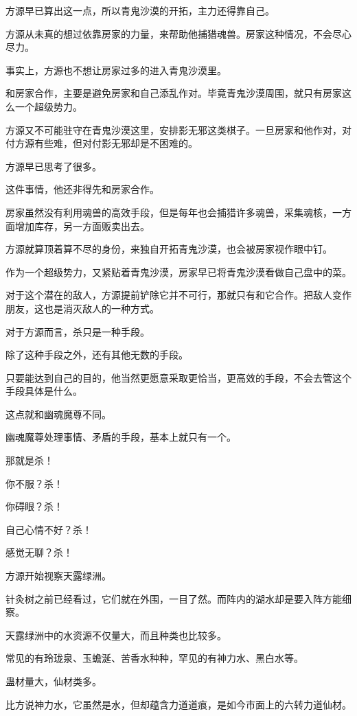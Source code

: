 \begin{this_body}
方源早已算出这一点，所以青鬼沙漠的开拓，主力还得靠自己。

方源从未真的想过依靠房家的力量，来帮助他捕猎魂兽。房家这种情况，不会尽心尽力。

事实上，方源也不想让房家过多的进入青鬼沙漠里。

和房家合作，主要是避免房家和自己添乱作对。毕竟青鬼沙漠周围，就只有房家这么一个超级势力。

方源又不可能驻守在青鬼沙漠这里，安排影无邪这类棋子。一旦房家和他作对，对付方源有些难，但对付影无邪却是不困难的。

方源早已思考了很多。

这件事情，他还非得先和房家合作。

房家虽然没有利用魂兽的高效手段，但是每年也会捕猎许多魂兽，采集魂核，一方面增加库存，另一方面贩卖出去。

方源就算顶着算不尽的身份，来独自开拓青鬼沙漠，也会被房家视作眼中钉。

作为一个超级势力，又紧贴着青鬼沙漠，房家早已将青鬼沙漠看做自己盘中的菜。

对于这个潜在的敌人，方源提前铲除它并不可行，那就只有和它合作。把敌人变作朋友，这也是消灭敌人的一种方式。

对于方源而言，杀只是一种手段。

除了这种手段之外，还有其他无数的手段。

只要能达到自己的目的，他当然更愿意采取更恰当，更高效的手段，不会去管这个手段具体是什么。

这点就和幽魂魔尊不同。

幽魂魔尊处理事情、矛盾的手段，基本上就只有一个。

那就是杀！

你不服？杀！

你碍眼？杀！

自己心情不好？杀！

感觉无聊？杀！

方源开始视察天露绿洲。

针灸树之前已经看过，它们就在外围，一目了然。而阵内的湖水却是要入阵方能细察。

天露绿洲中的水资源不仅量大，而且种类也比较多。

常见的有玲珑泉、玉蟾涎、苦香水种种，罕见的有神力水、黑白水等。

蛊材量大，仙材类多。

比方说神力水，它虽然是水，但却蕴含力道道痕，是如今市面上的六转力道仙材。


\end{this_body}
